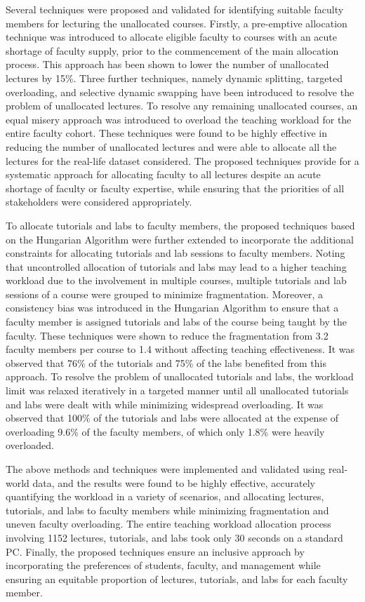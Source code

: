 Several techniques were proposed and validated for identifying suitable faculty members for lecturing the unallocated courses. Firstly, a pre-emptive allocation technique was introduced to allocate eligible faculty to courses with an acute shortage of faculty supply, prior to the commencement of the main allocation process. This approach has been shown to lower the number of unallocated lectures by 15\%. Three further techniques, namely dynamic splitting, targeted overloading, and selective dynamic swapping have been introduced to resolve the problem of unallocated lectures. To resolve any remaining unallocated courses, an equal misery approach was introduced to overload the teaching workload for the entire faculty cohort. These techniques were found to be highly effective in reducing the number of unallocated lectures and were able to allocate all the lectures for the real-life dataset considered. The proposed techniques provide for a systematic approach for allocating faculty to all lectures despite an acute shortage of faculty or faculty expertise, while ensuring that the priorities of all stakeholders were considered appropriately.

To allocate tutorials and labs to faculty members, the proposed techniques based on the Hungarian Algorithm were further extended to incorporate the additional constraints for allocating tutorials and lab sessions to faculty members. Noting that uncontrolled allocation of tutorials and labs may lead to a higher teaching workload due to the involvement in multiple courses, multiple tutorials and lab sessions of a course were grouped to minimize fragmentation. Moreover, a consistency bias was introduced in the Hungarian Algorithm to ensure that a faculty member is assigned tutorials and labs of the course being taught by the faculty. These techniques were shown to reduce the fragmentation from 3.2 faculty members per course to 1.4 without affecting teaching effectiveness. It was observed that 76\% of the tutorials and 75\% of the labs benefited from this approach. To resolve the problem of unallocated tutorials and labs, the workload limit was relaxed iteratively in a targeted manner until all unallocated tutorials and labs were dealt with while minimizing widespread overloading. It was observed that 100\% of the tutorials and labs were allocated at the expense of overloading 9.6\% of the faculty members, of which only 1.8\% were heavily overloaded.

The above methods and techniques were implemented and validated using real-world data, and the results were found to be highly effective, accurately quantifying the workload in a variety of scenarios, and allocating lectures, tutorials, and labs to faculty members while minimizing fragmentation and uneven faculty overloading. The entire teaching workload allocation process involving 1152 lectures, tutorials, and labs took only 30 seconds on a standard PC. Finally, the proposed techniques ensure an inclusive approach by incorporating the preferences of students, faculty, and management while ensuring an equitable proportion of lectures, tutorials, and labs for each faculty member.

